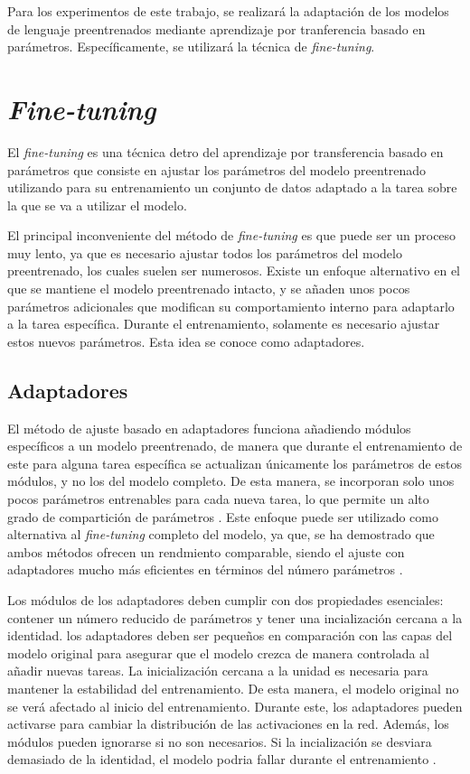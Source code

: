\documentclass[11pt,spanish,listoffigures,listoftables]{tfgetsinf}
\begin{document}
Para los experimentos de este trabajo, se realizará la adaptación de los modelos de lenguaje preentrenados mediante aprendizaje por tranferencia basado en parámetros. Específicamente, se utilizará la técnica de \textit{fine-tuning}.

\section{\textit{Fine-tuning}}

El \textit{fine-tuning} es una técnica detro del aprendizaje por transferencia basado en parámetros que consiste en ajustar los parámetros del modelo preentrenado utilizando para su entrenamiento un conjunto de datos adaptado a la tarea sobre la que se va a utilizar el modelo.

El principal inconveniente del método de \textit{fine-tuning} es que puede ser un proceso muy lento, ya que es necesario ajustar todos los parámetros del modelo preentrenado, los cuales suelen ser numerosos. Existe un enfoque alternativo en el que se mantiene el modelo preentrenado intacto, y se añaden unos pocos parámetros adicionales que modifican su comportamiento interno para adaptarlo a la tarea específica. Durante el entrenamiento, solamente es necesario ajustar estos nuevos parámetros. Esta idea se conoce como adaptadores.

\subsection{Adaptadores}

El método de ajuste basado en adaptadores funciona añadiendo módulos específicos a un modelo preentrenado, de manera que durante el entrenamiento de este para alguna tarea específica se actualizan únicamente los parámetros de estos módulos, y no los del modelo completo. De esta manera, se incorporan solo unos pocos parámetros entrenables para cada nueva tarea, lo que permite un alto grado de compartición de parámetros \cite{he2021effectivenessadapterbasedtuningpretrained}. Este enfoque puede ser utilizado como alternativa al \textit{fine-tuning} completo del modelo, ya que, se ha demostrado que ambos métodos ofrecen un rendmiento comparable, siendo el ajuste con adaptadores mucho más eficientes en términos del número parámetros \cite{houlsby2019parameterefficienttransferlearningnlp, stickland2019bertpalsprojectedattention}.

Los módulos de los adaptadores deben cumplir con dos propiedades esenciales: contener un número reducido de parámetros y tener una incialización cercana a la identidad. los adaptadores deben ser pequeños en comparación con las capas del modelo original para asegurar que el modelo crezca de manera controlada al añadir nuevas tareas. La inicialización cercana a la unidad es necesaria para mantener la estabilidad del entrenamiento. De esta manera, el modelo original no se verá afectado al inicio del entrenamiento. Durante este, los adaptadores pueden activarse para cambiar la distribución de las activaciones en la red. Además, los módulos pueden ignorarse si no son necesarios. Si la incialización se desviara demasiado de la identidad, el modelo podria fallar durante el entrenamiento \cite{houlsby2019parameterefficienttransferlearningnlp}.
\end{document}
